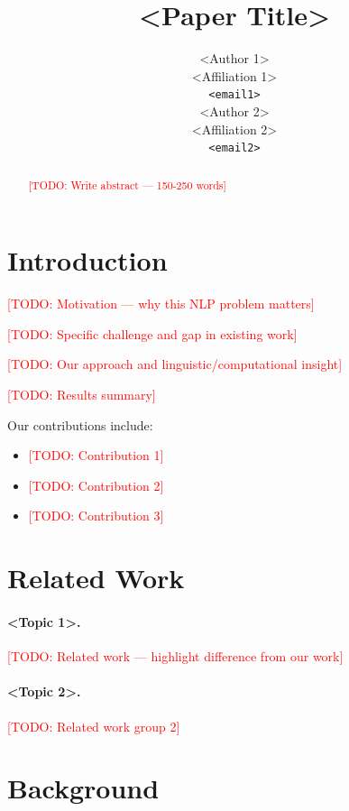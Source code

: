 \documentclass[11pt]{article}
\title{<Paper Title>}
\author{
  <Author 1> \\
  <Affiliation 1> \\
  \texttt{<email1>} \\\And
  <Author 2> \\
  <Affiliation 2> \\
  \texttt{<email2>} \\
}
\newcommand{\todo}[1]{\textcolor{red}{[TODO: #1]}}
\begin{document}
\maketitle

\begin{abstract}
\todo{Write abstract — 150-250 words}
\end{abstract}

\section{Introduction}
\label{sec:intro}

\todo{Motivation — why this NLP problem matters}

\todo{Specific challenge and gap in existing work}

\todo{Our approach and linguistic/computational insight}

\todo{Results summary}

Our contributions include:
\begin{itemize}
    \item \todo{Contribution 1}
    \item \todo{Contribution 2}
    \item \todo{Contribution 3}
\end{itemize}

\section{Related Work}
\label{sec:related}

\paragraph{<Topic 1>.}
\todo{Related work — highlight difference from our work}

\paragraph{<Topic 2>.}
\todo{Related work group 2}

\section{Background}
\label{sec:background}
\end{document}
